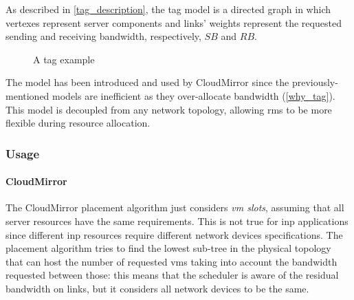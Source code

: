 
As described in \autoref{tag_description}, the \gls{tag} model is a directed graph in which vertexes represent server components and links' weights represent the requested sending and receiving bandwidth, respectively, $SB$ and $RB$.

\begin{figure}[!htb]
    \centering
    \usebox{\tagfigure}
    \caption{A \gls{tag} example}
\end{figure}

The model has been introduced and used by CloudMirror \cite{cloudmirror} since the previously-mentioned models are inefficient as they over-allocate bandwidth (\autoref{why_tag}).
This model is decoupled from any network topology, allowing \glspl{rm} to be more flexible during resource allocation.

\subsubsection{Usage}
\paragraph{CloudMirror \texorpdfstring{\cite{cloudmirror}}{}}
The CloudMirror \cite{cloudmirror} placement algorithm just considers \textit{\gls{vm} slots}, assuming that all server resources have the same requirements.
This is not true for \gls{inp} applications since different \gls{inp} resources require different network devices specifications.
The placement algorithm tries to find the lowest sub-tree in the physical topology that can host the number of requested \glspl{vm} taking into account the bandwidth requested between those: this means that the scheduler is aware of the residual bandwidth on links, but it considers all network devices to be the same.